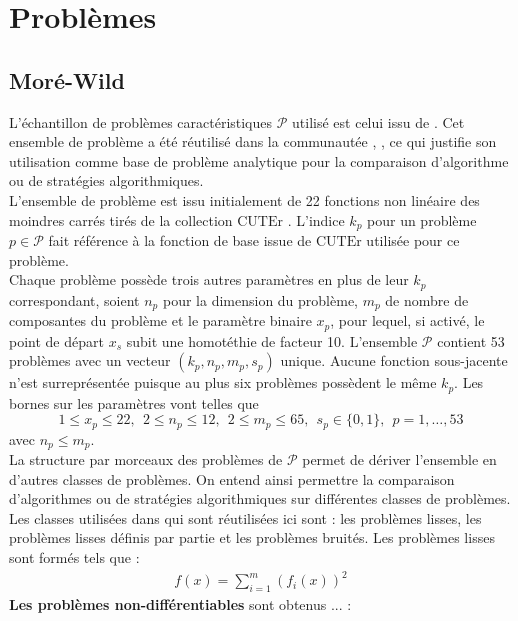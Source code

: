 \documentclass[letterpaper]{scrartcl}
\newcommand{\Pset}{\mathcal{P}}
\begin{document}
\section{Problèmes}
\subsection{Moré-Wild}
L'échantillon de problèmes caractéristiques $\Pset$ utilisé est celui issu de \cite{MoWi2009}. Cet ensemble de problème a été réutilisé dans la communautée \cite{CoLed2011}, \cite{VaVi07}, ce qui justifie son utilisation comme base de problème analytique pour la comparaison d'algorithme ou de stratégies algorithmiques.\\
L'ensemble de problème est issu initialement de 22 fonctions non linéaire des moindres carrés tirés de la collection $\mathrm{CUTEr}$ \cite{GoOrTo03}. L'indice $k_p$ pour un problème $p \in \mathcal{P}$ fait référence à la fonction de base issue de $\mathrm{CUTEr}$ utilisée pour ce problème.\\
Chaque problème possède trois autres paramètres en plus de leur $k_p$ correspondant, soient $n_p$ pour la dimension du problème, $m_p$ de nombre de composantes du problème et le paramètre binaire $x_p$, pour lequel, si activé, le point de départ $x_s$ subit une homotéthie de facteur 10. L'ensemble $\Pset$ contient 53 problèmes avec un vecteur $ (k_p,n_p,m_p,s_p) $ unique. Aucune fonction sous-jacente n'est surreprésentée puisque au plus six problèmes possèdent le même $k_p$. Les bornes sur les paramètres vont telles que 
\begin{equation*}
1 \leq x_p \leq 22,\ \ 2 \leq n_p \leq 12,\ \ 2\leq m_p\leq 65,\ \ s_p \in \{0,1\},\ \ p=1,\dots,53
\end{equation*}
avec $n_p \leq m_p$.\\
La structure par morceaux des problèmes de $\Pset$ permet de dériver l'ensemble en d'autres classes de problèmes. On entend ainsi permettre la comparaison d'algorithmes ou de stratégies algorithmiques sur différentes classes de problèmes. Les classes utilisées dans \cite{MoWi2009} qui sont réutilisées ici sont : les problèmes lisses, les problèmes lisses définis par partie et les problèmes bruités. Les problèmes lisses sont formés tels que : 
\begin{gather*}
f(x)=\sum_{i=1}^{m}{\left(f_i(x)\right)}^2
\end{gather*}
\textbf{Les problèmes non-différentiables} sont obtenus ... : 
\end{document}

